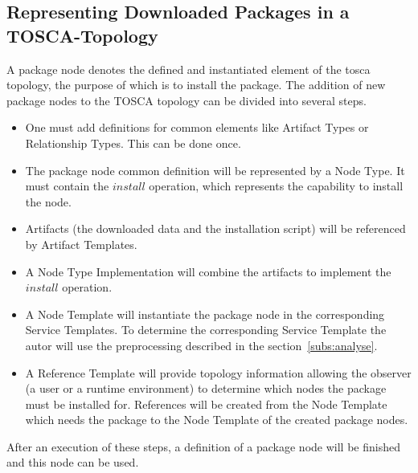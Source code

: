 \subsection{Representing Downloaded Packages in a TOSCA-Topology} \label{subs:repres}
A package node denotes the defined and instantiated element of the \gls{tosca} topology, the purpose of which is to install the package.
The addition of new package nodes to the TOSCA topology can be divided into several steps.
\begin{itemize}
	\item One must add definitions for common elements like Artifact Types or Relationship Types. 
		This can be done once.
	\item The package node common definition will be represented by a Node Type. 
		It must contain the $install$ operation, which represents the capability to install the node.
	\item Artifacts (the downloaded data and the installation script) will be referenced by Artifact Templates.
	\item A Node Type Implementation will combine the artifacts to implement the $install$ operation.
	\item A Node Template will instantiate the package node in the corresponding Service Templates.
		To determine the corresponding Service Template the autor will use the preprocessing described in the section~\ref{subs:analyse}.
	\item A Reference Template will provide topology information allowing the observer (a user or a runtime environment) to determine which nodes the package must be installed for.
		References will be created from the Node Template which needs the package to the Node Template of the created package nodes.
\end{itemize}
After an execution of these steps, a definition of a package node will be finished and this node can be used.

